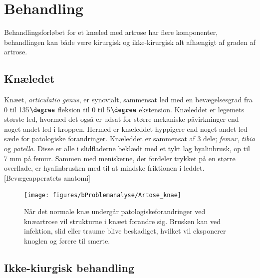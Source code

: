 \section{Behandling}
Behandlingsforløbet for et knæled med artrose har flere komponenter, behandlingen kan både  være kirurgisk og ikke-kirurgisk alt afhængigt af graden af artrose.
\subsection*{Knæledet}
Knæet, \textit{articulatio genus}, er synovialt, sammensat led med en bevægelsesgrad fra 0 til 135$\degree$ fleksion til 0 til 5$\degree$ ekstension. Knæleddet er legemets største led, hvormed det også er udsat for større mekaniske påvirkninger end noget andet led i kroppen. Hermed er knæleddet hyppigere end noget andet led sæde for patologiske forandringer. Knæleddet er sammensat af 3 dele; \textit{femur}, \textit{tibia} og \textit{patella}. Disse er alle i slidfladerne beklædt med et tykt lag hyalinbrusk, op til 7 mm på femur. Sammen med meniskerne, der fordeler trykket på en større overflade, er hyalinbrusken med til at mindske friktionen i leddet. [Bevægeapperatets anatomi]

\begin{figure}[H] 
\begin{center}
\texttt{[image: figures/bProblemanalyse/Artose\_knae]}
\end{center}
\caption{Når det normale knæ undergår patologiskeforandringer ved knæartrose vil strukturne i knæet forandre sig. Brusken kan ved infektion, slid eller traume blive beskadiget, hvilket vil eksponerer knoglen og førere til smerte.\citep{schroder} \citep{adobe}} 
\label{fig:tka_implant} 
\end{figure}

\subsection{Ikke-kiurgisk behandling}

